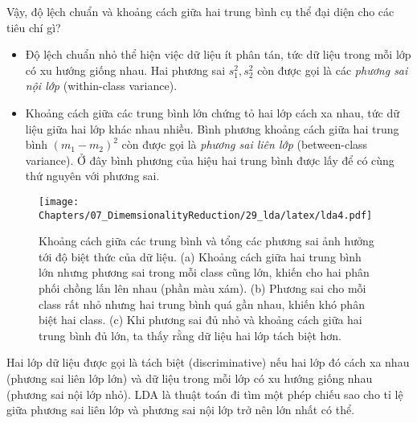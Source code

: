 Vậy, độ lệch chuẩn và khoảng cách giữa hai trung bình cụ thể đại diện cho các tiêu
chí gì?
\begin{itemize}
\item Độ lệch chuẩn nhỏ thể hiện việc dữ liệu ít phân tán, tức dữ liệu
trong mỗi lớp có xu hướng giống nhau. Hai phương sai $s_1^2, s_2^2$ còn được
gọi là các \textit{phương sai nội lớp} ({within-class variance}).

\item Khoảng cách giữa các trung bình lớn chứng tỏ hai lớp cách xa
nhau, tức dữ liệu giữa hai lớp khác nhau nhiều. Bình phương khoảng cách
giữa hai trung bình $(m_1 - m_2)^2$ còn được gọi là \textit{phương sai liên lớp} ({between-class variance}). Ở đây bình phương của hiệu hai trung bình được lấy để có cùng thứ nguyên với phương sai.
\end{itemize}

\begin{figure}[t]
\centering
\texttt{[image: Chapters/07\_DimemsionalityReduction/29\_lda/latex/lda4.pdf]}
\caption[]{Khoảng cách giữa các trung bình và tổng các phương sai ảnh hưởng
tới độ biệt thức của dữ liệu. (a) Khoảng cách giữa hai trung bình
lớn nhưng phương sai trong mỗi class cũng lớn, khiến cho hai phân phối
chồng lấn lên nhau (phần màu xám). (b) Phương sai cho mỗi class rất nhỏ
nhưng hai trung bình quá gần nhau, khiến khó phân biệt hai class. (c) Khi
phương sai đủ nhỏ và khoảng cách giữa hai trung bình đủ lớn, ta thấy rằng dữ
liệu hai lớp tách biệt hơn.}
\label{fig:29_2}
\end{figure}
Hai lớp dữ liệu được gọi là {tách biệt} (discriminative) nếu hai lớp đó cách xa nhau
(phương sai liên lớp lớn) và dữ liệu trong mỗi lớp có xu hướng giống nhau
(phương sai nội lớp nhỏ). LDA là thuật toán đi tìm một phép chiếu sao cho tỉ
lệ giữa phương sai liên lớp và phương sai nội lớp trở nên lớn
nhất có thể.



